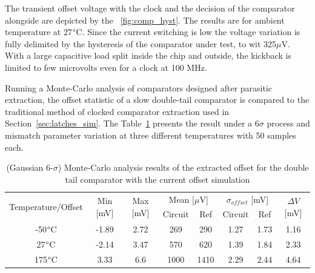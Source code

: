 The transient offset voltage with the clock and the decision of the comparator alongside are depicted by the \figurename~\ref{fig:comp_hyst}. The results are for ambient temperature at 27$\degree$C. Since the current switching is low the voltage variation is fully delimited by the hysteresis of the comparator under test, to wit 325$\mu$V. With a large capacitive load split inside the chip and outside, the kickback is limited to few microvolts even for a clock at 100 MHz.

Running a Monte-Carlo analysis of comparators designed after parasitic extraction, the offset statistic of a slow double-tail comparator is compared to the traditional method of clocked comparator extraction used in Section~\ref{sec:latches_sim}. The Table~\ref{tbl:offset_fb_dtl_post_layout} presents the result under a 6$\sigma$ process and mismatch parameter variation at three different temperatures with 50 samples each.

\begin{table}[htp]
    \centering
    \caption{(Gaussian 6-$\sigma$) Monte-Carlo analysis results of the extracted offset for the double tail comparator with the current offset simulation}
    \label{tbl:offset_fb_dtl_post_layout}
    \begin{tabular}{cccccccc}
    \hline
    \multirow{2}{*}{Temperature/Offset} & \multirow{2}{*}{Min {[}mV{]}} & \multirow{2}{*}{Max {[}mV{]}} & \multicolumn{2}{c}{Mean {[}$\mu$V{]}} & \multicolumn{2}{c}{$\sigma_{offset}$ {[}mV{]}} & \multirow{2}{*}{$\Delta V$ {[}mV{]}} \\
                                        &                               &                               & Circuit           & Ref            & Circuit                 & Ref                  &                                   \\ \hline
    -50$\degree$C                          & -1.89                         & 2.72                          & 269               & 290            & 1.27                    & 1.73                 & 1.16                              \\
    27$\degree$C                           & -2.14                         & 3.47                          & 570               & 620            & 1.39                    & 1.84                 & 2.33                              \\
    175$\degree$C                          & 3.33                          & 6.6                           & 1000              & 1410           & 2.29                    & 2.44                 & 4.64                              \\ \hline
    \end{tabular}
\end{table}

